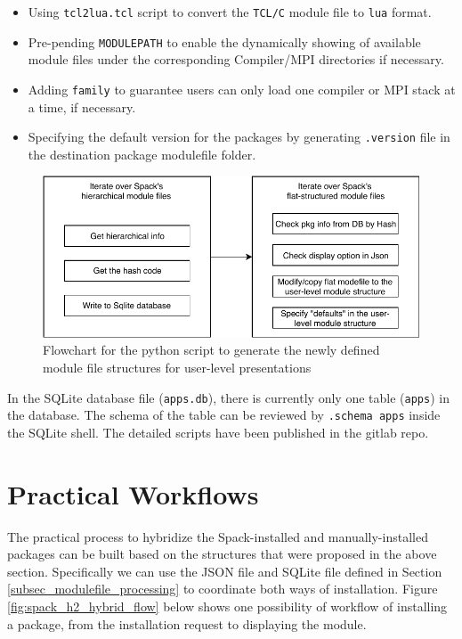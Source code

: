 \documentclass[conference]{IEEEtran}
\begin{document}
\begin{itemize}
    \item Using \texttt{tcl2lua.tcl} script to convert the \texttt{TCL/C} module file to \texttt{lua} format.
    \item Pre-pending \texttt{MODULEPATH} to enable the dynamically showing of available module files under the corresponding Compiler/MPI directories if necessary.
    \item Adding \texttt{family} to guarantee users can only load one compiler or MPI stack at a time, if necessary.
    \item Specifying the default version for the packages by generating \texttt{.version} file in the destination package modulefile folder.
\end{itemize}

\begin{figure}[htbp]
  \centerline{\includegraphics[width=\linewidth]{figures/modulefilter_flowchart}}
  \caption{Flowchart for the python script to generate the newly defined module file structures for user-level presentations}
  \label{fig:modulefilter_flowchart}
\end{figure}

In the SQLite database file (\verb|apps.db|), there is currently only one table (\verb|apps|) in the database. The schema of the table can be reviewed by \verb|.schema apps| inside the SQLite shell. The detailed scripts have been published in the gitlab repo\cite{gitlabrepo}.


\section{Practical Workflows} \label{sec_workflow}

The practical process to hybridize the Spack-installed and manually-installed packages can be built based on the structures that were proposed in the above section. Specifically we can use the JSON file and SQLite file defined in Section \ref{subsec_modulefile_processing} to coordinate both ways of installation. Figure \ref{fig:spack_h2_hybrid_flow} below shows one possibility of workflow of installing a package, from the installation request to displaying the module.
\end{document}
